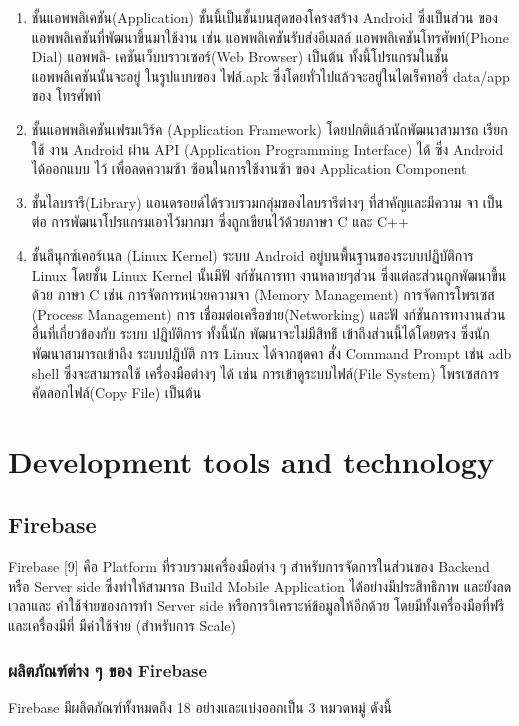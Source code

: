 \begin{enumerate}
    \item ชั้นแอพพลิเคชัน(Application) ชั้นนี้เป็นชั้นบนสุดของโครงสร้าง Android ซึ่งเป็นส่วน ของแอพพลิเคชันที่พัฒนาขึ้นมาใช้งาน เช่น แอพพลิเคชันรับส่งอีเมลล์ แอพพลิเคชันโทรศัพท์(Phone Dial) แอพพลิ-
    เคชันเว็บบราวเซอร์(Web Browser) เป็นต้น ทั้งนี้โปรแกรมในชั้น แอพพลิเคชันนั้นจะอยู่ ในรูปแบบของ
    ไฟล์.apk ซึ่งโดยทั่วไปแล้วจะอยู่ในไดเร็คทอรี่ data/app ของ โทรศัพท์
    
    \item ชั้นแอพพลิเคชันเฟรมเวิร์ค (Application Framework) โดยปกติแล้วนักพัฒนาสามารถ เรียกใช้
    งาน Android ผ่าน API (Application Programming Interface) ได้ ซึ่ง Android ได้ออกแบบ ไว้
    เพื่อลดความซ้า ซ้อนในการใช้งานซ้า ของ Application Component
    \item ชั้นไลบรารี(Library) แอนดรอยด์ได้รวบรวมกลุ่มของไลบรารีต่างๆ ที่สาคัญและมีความ จา เป็นต่อ
    การพัฒนาโปรแกรมเอาไว้มากมา ซึ่งถูกเขียนไว้ด้วยภาษา C และ C++

    \item ชั้นลีนุกซ์เคอร์เนล (Linux Kernel) ระบบ Android อยู่บนพื้นฐานของระบบปฏิบัติการ Linux
    โดยชั้น Linux Kernel นั้นมีฟั งก์ชันการทา งานหลายๆส่วน ซึ่งแต่ละส่วนถูกพัฒนาขึ้นด้วย ภาษา C เช่น
    การจัดการหน่วยความจา (Memory Management) การจัดการโพรเซส (Process Management) การ
    เชื่อมต่อเครือข่าย(Networking) และฟั งก์ชันการทางานส่วนอื่นที่เกี่ยวข้องกับ ระบบ ปฏิบัติการ ทั้งนี้นัก
    พัฒนาจะไม่มีสิทธ์ิ
    เข้าถึงส่วนนี้ได้โดยตรง ซึ่งนักพัฒนาสามารถเข้าถึง ระบบปฏิบัติ การ Linux ได้จากชุดคา
    สั่ง Command Prompt เช่น adb shell ซึ่งจะสามารถใช้ เครื่องมือต่างๆ ได้ เช่น การเข้าดูระบบไฟล์(File
    System) โพรเซสการคัดลอกไฟล์(Copy File) เป็นต้น
    
\end{enumerate}
\section{Development tools and technology}
\subsection{Firebase}
Firebase [9] คือ Platform ที่รวบรวมเครื่องมือต่าง ๆ สําหรับการจัดการในส่วนของ Backend หรือ
Server side ซึ่งทําให้สามารถ Build Mobile Application ได้อย่างมีประสิทธิภาพ และยังลดเวลาและ
ค่าใช้จ่ายของการทํา Server side หรือการวิเคราะห์ข้อมูลให้อีกด้วย โดยมีทั้งเครื่องมือที่ฟรี และเครื่องมีที่
มีค่าใช้จ่าย (สําหรับการ Scale)

\subsubsection{ผลิตภัณฑ์ต่าง ๆ ของ Firebase}
Firebase มีผลิตภัณฑ์ทั้งหมดถึง 18 อย่างและแบ่งออกเป็น 3 หมวดหมู่ ดังนี้

